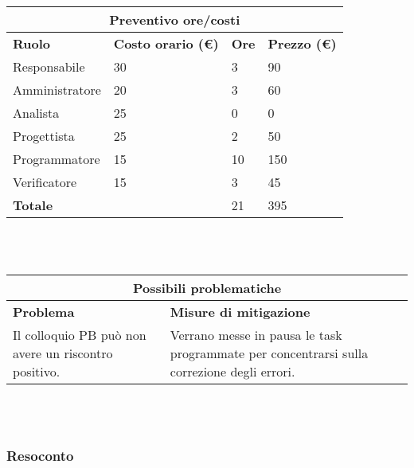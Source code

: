 \documentclass[a4paper, 12pt]{article}
\begin{document}
\begin{center}
    \begin{tabularx}{\textwidth}{|X|X|X|X|}
        \hline
        \multicolumn{4}{|c|}{\textbf{Preventivo ore/costi}}\\
        \hline
        \hline
        \textbf{Ruolo} & \textbf{Costo orario (\euro)} & \textbf{Ore} & \textbf{Prezzo (\euro)}\\
        \hline
        Responsabile    & 30 & 3  & 90\\
        \hline
        Amministratore  & 20 & 3  & 60\\
        \hline
        Analista        & 25 & 0  & 0\\
        \hline
        Progettista     & 25 & 2  & 50\\
        \hline
        Programmatore   & 15 & 10  & 150\\
        \hline
        Verificatore    & 15 & 3  & 45\\
        \hline
        \hline
        \textbf{Totale} &    & 21 & 395\\
        \hline
    \end{tabularx}\\[8pt]
    \mbox{}\\
\end{center}

\begin{center}
    \begin{tabularx}{\textwidth}{|X|X|}
        \hline
        \multicolumn{2}{|c|}{\textbf{Possibili problematiche}}\\
        \hline
        \hline
        \textbf{Problema} & \textbf{Misure di mitigazione}\\
        \hline
        Il colloquio PB può non avere un riscontro positivo. & Verrano messe in pausa le task programmate per concentrarsi sulla correzione degli errori.\\
        \hline
    \end{tabularx}\\[8pt]
    \mbox{}\\
\end{center}
\subsubsection{Resoconto}\mbox{}
\end{document}
